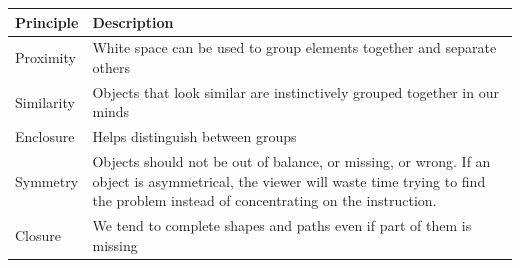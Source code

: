 \documentclass[]{book}
\theoremstyle{definition}
\theoremstyle{definition}
\theoremstyle{definition}
\theoremstyle{remark}
\begin{document}
\begin{longtable}[]{@{}ll@{}}
\toprule
\begin{minipage}[b]{0.16\columnwidth}\raggedright\strut
\textbf{Principle}\strut
\end{minipage} & \begin{minipage}[b]{0.78\columnwidth}\raggedright\strut
\textbf{Description}\strut
\end{minipage}\tabularnewline
\midrule
\endhead
\begin{minipage}[t]{0.16\columnwidth}\raggedright\strut
Proximity\strut
\end{minipage} & \begin{minipage}[t]{0.78\columnwidth}\raggedright\strut
White space can be used to group elements together and separate
others\strut
\end{minipage}\tabularnewline
\begin{minipage}[t]{0.16\columnwidth}\raggedright\strut
Similarity\strut
\end{minipage} & \begin{minipage}[t]{0.78\columnwidth}\raggedright\strut
Objects that look similar are instinctively grouped together in our
minds\strut
\end{minipage}\tabularnewline
\begin{minipage}[t]{0.16\columnwidth}\raggedright\strut
Enclosure\strut
\end{minipage} & \begin{minipage}[t]{0.78\columnwidth}\raggedright\strut
Helps distinguish between groups\strut
\end{minipage}\tabularnewline
\begin{minipage}[t]{0.16\columnwidth}\raggedright\strut
Symmetry\strut
\end{minipage} & \begin{minipage}[t]{0.78\columnwidth}\raggedright\strut
Objects should not be out of balance, or missing, or wrong. If an object
is asymmetrical, the viewer will waste time trying to find the problem
instead of concentrating on the instruction.\strut
\end{minipage}\tabularnewline
\begin{minipage}[t]{0.16\columnwidth}\raggedright\strut
Closure\strut
\end{minipage} & \begin{minipage}[t]{0.78\columnwidth}\raggedright\strut
We tend to complete shapes and paths even if part of them is
missing\strut
\end{minipage}\tabularnewline

\end{longtable}
\end{document}
